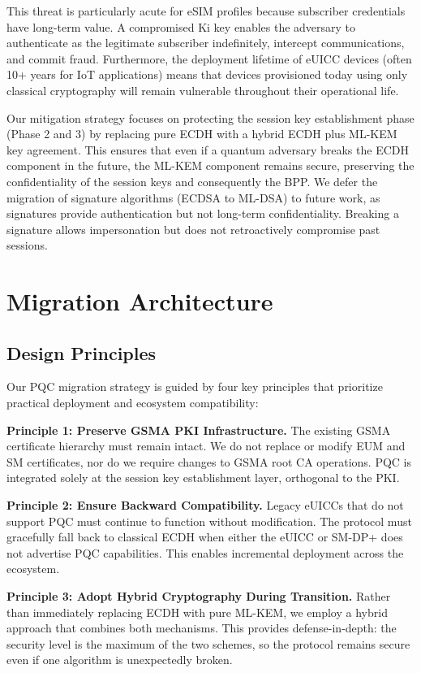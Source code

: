 \documentclass{easychair}
\begin{document}
This threat is particularly acute for eSIM profiles because subscriber credentials have long-term value. A compromised Ki key enables the adversary to authenticate as the legitimate subscriber indefinitely, intercept communications, and commit fraud. Furthermore, the deployment lifetime of eUICC devices (often 10+ years for IoT applications) means that devices provisioned today using only classical cryptography will remain vulnerable throughout their operational life.

Our mitigation strategy focuses on protecting the session key establishment phase (Phase 2 and 3) by replacing pure ECDH with a hybrid ECDH plus ML-KEM key agreement. This ensures that even if a quantum adversary breaks the ECDH component in the future, the ML-KEM component remains secure, preserving the confidentiality of the session keys and consequently the BPP. We defer the migration of signature algorithms (ECDSA to ML-DSA) to future work, as signatures provide authentication but not long-term confidentiality. Breaking a signature allows impersonation but does not retroactively compromise past sessions.

\section{Migration Architecture}

\subsection{Design Principles}

Our PQC migration strategy is guided by four key principles that prioritize practical deployment and ecosystem compatibility:

\textbf{Principle 1: Preserve GSMA PKI Infrastructure.} The existing GSMA certificate hierarchy must remain intact. We do not replace or modify EUM and SM certificates, nor do we require changes to GSMA root CA operations. PQC is integrated solely at the session key establishment layer, orthogonal to the PKI.

\textbf{Principle 2: Ensure Backward Compatibility.} Legacy eUICCs that do not support PQC must continue to function without modification. The protocol must gracefully fall back to classical ECDH when either the eUICC or SM-DP+ does not advertise PQC capabilities. This enables incremental deployment across the ecosystem.

\textbf{Principle 3: Adopt Hybrid Cryptography During Transition.} Rather than immediately replacing ECDH with pure ML-KEM, we employ a hybrid approach that combines both mechanisms. This provides defense-in-depth: the security level is the maximum of the two schemes, so the protocol remains secure even if one algorithm is unexpectedly broken.
\end{document}
